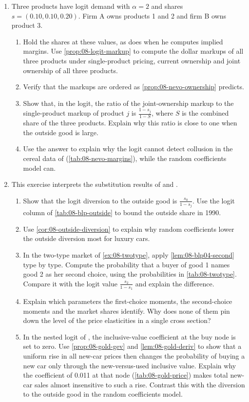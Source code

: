 \begin{enumerate}[label=\arabic*., leftmargin=*, itemsep=6pt]
\item Three products have logit demand with $\alpha = 2$ and shares $s = (0.10, 0.10, 0.20)$. Firm A owns products 1
and 2 and firm B owns product 3.
\begin{enumerate}[label=(\alph*)]
  \item Hold the shares at these values, as \citet{Nevo2001} does when he computes implied margins. Use
  \cref{prop:08-logit-markup} to compute the dollar markups of all three products under single-product pricing,
  current ownership and joint ownership of all three products.
  \item Verify that the markups are ordered as \cref{prop:08-nevo-ownership} predicts.
  \item Show that, in the logit, the ratio of the joint-ownership markup to the single-product markup of product
  $j$ is $\frac{1 - s_j}{1 - S}$, where $S$ is the combined share of the three products. Explain why this ratio is
  close to one when the outside good is large.
  \item Use the answer to explain why the logit cannot detect collusion in the cereal data of \citet{Nevo2001}
  (\cref{tab:08-nevo-margins}), while the random coefficients model can.
\end{enumerate}

\item This exercise interprets the substitution results of \citet{BerryLevinsohnPakes1995} and
\citet{BerryLevinsohnPakes2004}.
\begin{enumerate}[label=(\alph*)]
  \item Show that the logit diversion to the outside good is $\frac{s_0}{1 - s_j}$. Use the logit column of
  \cref{tab:08-blp-outside} to bound the outside share in 1990.
  \item Use \cref{cor:08-outside-diversion} to explain why random coefficients lower the outside diversion most for
  luxury cars.
  \item In the two-type market of \cref{ex:08-twotype}, apply \cref{lem:08-blp04-second} type by type. Compute
  the probability that a buyer of good 1 names good 2 as her second choice, using the probabilities in
  \cref{tab:08-twotype}. Compare it with the logit value $\frac{s_2}{1 - s_1}$ and explain the difference.
  \item Explain which parameters the first-choice moments, the second-choice moments and the market shares
  identify. Why does none of them pin down the level of the price elasticities in a single cross section?
  \item In the nested logit of \citet{Goldberg1995}, the inclusive-value coefficient at the buy node is set to
  zero. Use \cref{prop:08-gold-gev} and \cref{lem:08-gold-deriv} to show that a uniform rise in all new-car prices
  then changes the probability of buying a new car only through the new-versus-used inclusive value. Explain why the coefficient of 0.011 at that node (\cref{tab:08-gold-price})
  makes total new-car sales almost insensitive to such a rise. Contrast this with the diversion to the outside good
  in the random coefficients model.
\end{enumerate}

\end{enumerate}
